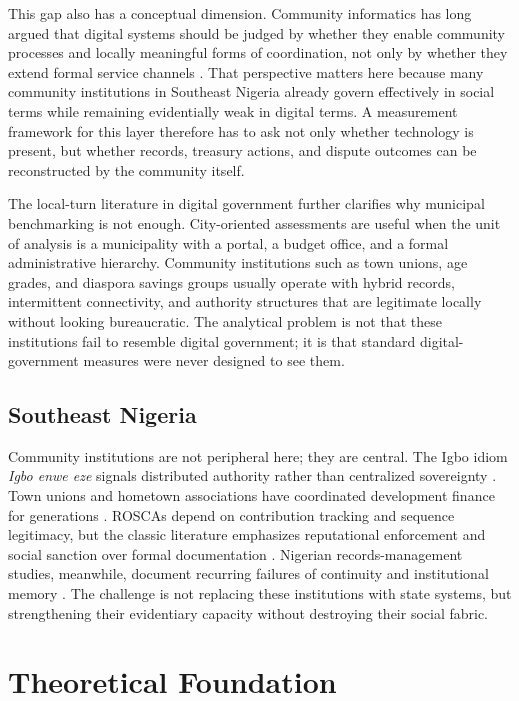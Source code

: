 \documentclass[review,onecolumn]{elsarticle}
\begin{document}
This gap also has a conceptual dimension. Community informatics has long argued that digital systems should be judged by whether they enable community processes and locally meaningful forms of coordination, not only by whether they extend formal service channels \cite{gurstein2007}. That perspective matters here because many community institutions in Southeast Nigeria already govern effectively in social terms while remaining evidentially weak in digital terms. A measurement framework for this layer therefore has to ask not only whether technology is present, but whether records, treasury actions, and dispute outcomes can be reconstructed by the community itself.

The local-turn literature in digital government further clarifies why municipal benchmarking is not enough. City-oriented assessments are useful when the unit of analysis is a municipality with a portal, a budget office, and a formal administrative hierarchy. Community institutions such as town unions, age grades, and diaspora savings groups usually operate with hybrid records, intermittent connectivity, and authority structures that are legitimate locally without looking bureaucratic. The analytical problem is not that these institutions fail to resemble digital government; it is that standard digital-government measures were never designed to see them.

\subsection{Southeast Nigeria}

Community institutions are not peripheral here; they are central. The Igbo idiom \textit{Igbo enwe eze} signals distributed authority rather than centralized sovereignty \cite{okafor1992}. Town unions and hometown associations have coordinated development finance for generations \cite{honey1998}. ROSCAs depend on contribution tracking and sequence legitimacy, but the classic literature emphasizes reputational enforcement and social sanction over formal documentation \cite{ardener1964,besley1993}. Nigerian records-management studies, meanwhile, document recurring failures of continuity and institutional memory \cite{abioye2007}. The challenge is not replacing these institutions with state systems, but strengthening their evidentiary capacity without destroying their social fabric.

\section{Theoretical Foundation}
\end{document}
